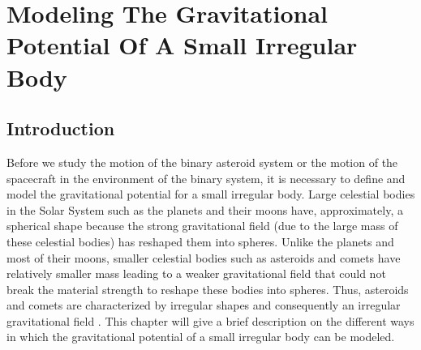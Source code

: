 \chapter{Modeling The Gravitational Potential Of A Small Irregular Body}
\label{gravpot}
\graphicspath{{chapter-2/Images/}}

\section{Introduction}
Before we study the motion of the binary asteroid system or the motion of the spacecraft in the environment of the binary system, it is necessary to define and model the gravitational potential for a small irregular body. Large celestial bodies in the Solar System such as the planets and their moons have, approximately, a spherical shape because the strong gravitational field (due to the large mass of these celestial bodies) has reshaped them into spheres. Unlike the planets and most of their moons, smaller celestial bodies such as asteroids and comets have relatively smaller mass leading to a weaker gravitational field that could not break the material strength to reshape these bodies into spheres. Thus, asteroids and comets are characterized by irregular shapes and consequently an irregular gravitational field \cite{sucarrat_phd}. This chapter will give a brief description on the different ways in which the gravitational potential of a small irregular body can be modeled.

